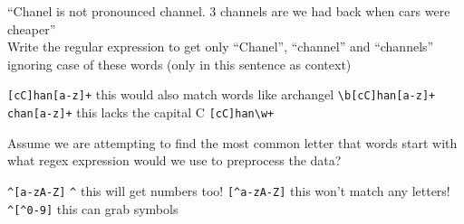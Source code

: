 \documentclass[theme=sleek, randomorder, hidesidemenu]{webquiz}
\begin{document}
\begin{question}
  ``Chanel is not pronounced channel. 3 channels are we had back when cars were cheaper''\\
  Write the regular expression to get only ``Chanel'', ``channel'' and ``channels'' ignoring case of these words (only in this sentence as context)

  \begin{choice}[columns=2]
    \incorrect \verb|[cC]han[a-z]+|
    \feedback this would also match words like archangel
    \correct \verb|\b[cC]han[a-z]+|
    \incorrect \verb|chan[a-z]+| \feedback this lacks the capital C
    \incorrect \verb|[cC]han\w+|

  \end{choice}


\end{question}
\begin{question}
  Assume we are attempting to find the most common letter that words start with what regex expression would we use to preprocess the data?
  \begin{choice}[columns=2]
    \correct \verb|^[a-zA-Z]|
    \incorrect \verb|^| \feedback this will get numbers too!
    \incorrect \verb|[^a-zA-Z]| \feedback this won't match any letters!
    \incorrect \verb|^[^0-9]| \incorrect this can grab symbols
  \end{choice}

\end{question}
\end{document}
